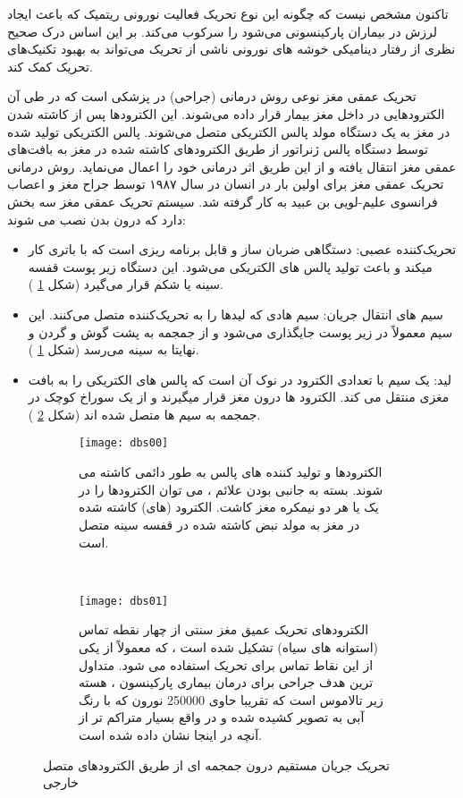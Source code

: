 تاکنون مشخص نیست که چگونه این نوع تحریک فعالیت نورونی ریتمیک که باعث ایجاد لرزش در بیماران پارکینسونی می‌شود را سرکوب می‌کند. بر این اساس درک صحیح نظری از رفتار دینامیکی خوشه های نورونی ناشی از تحریک می‌تواند به بهبود تکنیک‌های تحریک کمک کند.

تحریک عمقی مغز
 نوعی روش درمانی (جراحی) در پزشکی است که در طی آن الکترودهایی در داخل مغز بیمار قرار داده می‌شوند. این الکترودها پس از کاشته شدن در مغز به یک دستگاه مولد پالس الکتریکی
  متصل می‌شوند. پالس الکتریکی تولید شده توسط دستگاه پالس ژنراتور از طریق الکترودهای کاشته شده در مغز به بافت‌های عمقی مغز انتقال یافته و از این طریق اثر درمانی خود را اعمال می‌نماید. روش درمانی تحریک عمقی مغز برای اولین بار در انسان در سال ۱۹۸۷ توسط جراح مغز و اعصاب فرانسوی علیم-لویی بن عبید
به کار گرفته شد. سیستم تحریک عمقی مغز سه بخش دارد که درون بدن نصب می شوند:
\begin{itemize}
\item تحریک‌کننده عصبی: دستگاهی ضربان ساز و قابل برنامه ریزی است که با باتری کار میکند و باعث تولید پالس های الکتریکی می‌شود. این دستگاه زیر پوست قفسه سینه یا شکم قرار می‌گیرد (شکل 
\ref{fig:dbs00}
).
\item سیم های انتقال جریان: سیم هادی که لیدها را به تحریک‌کننده متصل می‌کنند. این سیم معمولاً در زیر پوست جایگذاری می‌شود و از جمجمه به پشت گوش و گردن و نهایتا به سینه می‌رسد (شکل 
\ref{fig:dbs00}
).
\item لید: یک سیم با تعدادی الکترود در نوک آن است که پالس های الکتریکی را به بافت مغزی منتقل می کند. الکترود ها درون مغز قرار میگیرند و از یک سوراخ کوچک در جمجمه به سیم ها متصل شده اند (شکل 
\ref{fig:dbs01}
).
\end{itemize}

\begin{figure}
    \centering
     \begin{subfigure}[t]{0.45\textwidth}
         \centering
         \texttt{[image: dbs00]}
         \caption{
         الکترودها و تولید کننده های پالس به طور دائمی کاشته می شوند. 
         بسته به جانبی بودن علائم ، می توان الکترودها را در یک یا هر دو نیمکره مغز کاشت.
         الکترود (های) کاشته شده در مغز به مولد نبض کاشته شده در قفسه سینه متصل است.
         }
         \label{fig:dbs00}
     \end{subfigure}
    \
         \begin{subfigure}[t]{0.45\textwidth}
         \centering
         \texttt{[image: dbs01]}
         \caption{  
         الکترودهای تحریک عمیق مغز سنتی از چهار نقطه تماس (استوانه های سیاه) تشکیل شده است ، که
         معمولاً از یکی از این نقاط تماس برای تحریک استفاده می شود.
         متداول ترین هدف جراحی برای درمان بیماری پارکینسون ، هسته زیر تالاموس است که تقریبا حاوی 250000 نورون  که با رنگ آبی به تصویر کشیده شده و در واقع بسیار متراکم تر از آنچه در اینجا نشان داده شده است.
         }
         \label{fig:dbs01}
     \end{subfigure}
     \caption{تحریک جریان مستقیم درون جمجمه ای از طریق الکترودهای متصل خارجی }
    \label{fig:dbs}
\end{figure}

